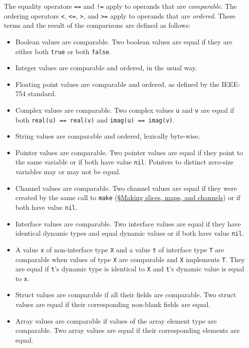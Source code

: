 {The equality operators \texttt{==} and \texttt{!=} apply to operands
that are \emph{comparable}. The ordering operators \texttt{\textless{}},
\texttt{\textless{}=}, \texttt{\textgreater{}}, and
\texttt{\textgreater{}=} apply to operands that are \emph{ordered}.
These terms and the result of the comparisons are defined as follows:

\begin{itemize}
\item
  Boolean values are comparable. Two boolean values are equal if they
  are either both \texttt{true} or both \texttt{false}.
\item
  Integer values are comparable and ordered, in the usual way.
\item
  Floating point values are comparable and ordered, as defined by the
  IEEE-754 standard.
\item
  Complex values are comparable. Two complex values \texttt{u} and
  \texttt{v} are equal if both \texttt{real(u) == real(v)} and
  \texttt{imag(u) == imag(v)}.
\item
  String values are comparable and ordered, lexically byte-wise.
\item
  Pointer values are comparable. Two pointer values are equal if they
  point to the same variable or if both have value \texttt{nil}.
  Pointers to distinct
  zero-size variables may
  or may not be equal.
\item
  Channel values are comparable. Two channel values are equal if they
  were created by the same call to \texttt{make}
  (§\hyperref[Making\_slices\_maps\_and\_channels]{Making slices, maps,
  and channels}) or if both have value \texttt{nil}.
\item
  Interface values are comparable. Two interface values are equal if
  they have identical dynamic types and equal
  dynamic values or if both have value \texttt{nil}.
\item
  A value \texttt{x} of non-interface type \texttt{X} and a value
  \texttt{t} of interface type \texttt{T} are comparable when values of
  type \texttt{X} are comparable and \texttt{X} implements \texttt{T}.
  They are equal if \texttt{t}'s dynamic type is identical to \texttt{X}
  and \texttt{t}'s dynamic value is equal to \texttt{x}.
\item
  Struct values are comparable if all their fields are comparable. Two
  struct values are equal if their corresponding
  non-blank fields are equal.
\item
  Array values are comparable if values of the array element type are
  comparable. Two array values are equal if their corresponding elements
  are equal.
\end{itemize}

}
